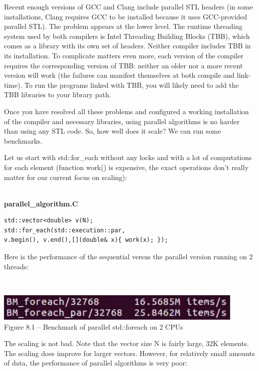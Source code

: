 Recent enough versions of GCC and Clang include parallel STL headers (in some installations, Clang requires GCC to be installed because it uses GCC-provided parallel STL). The problem appears at the lower level. The runtime threading system used by both compilers is Intel Threading Building Blocks (TBB), which comes as a library with its own set of headers. Neither compiler includes TBB in its installation. To complicate matters even more, each version of the compiler requires the corresponding version of TBB: neither an older nor a more recent version will work (the failures can manifest themselves at both compile and link-time). To run the programs linked with TBB, you will likely need to add the TBB libraries to your library path.

Once you have resolved all these problems and configured a working installation of the compiler and necessary libraries, using parallel algorithms is no harder than using any STL code. So, how well does it scale? We can run some benchmarks. 

Let us start with std::for\_each without any locks and with a lot of computations for each element (function work() is expensive, the exact operations don't really matter for our current focus on scaling):

\hspace*{\fill} \\ %
\noindent
\textbf{parallel\_algorithm.C}
\begin{lstlisting}[style=styleCXX]
std::vector<double> v(N);
std::for_each(std::execution::par,
v.begin(), v.end(),[](double& x){ work(x); });
\end{lstlisting}

Here is the performance of the sequential versus the parallel version running on 2 threads:

\hspace*{\fill} \\ %
\begin{center}
\includegraphics[width=0.9\textwidth]{content/2/chapter8/images/1.jpg}\\
Figure 8.1 – Benchmark of parallel std::foreach on 2 CPUs
\end{center}

The scaling is not bad. Note that the vector size N is fairly large, 32K elements. The scaling does improve for larger vectors. However, for relatively small amounts of data, the  performance of parallel algorithms is very poor:

